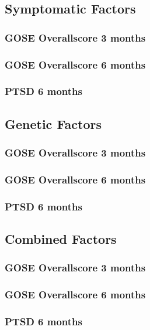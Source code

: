 \documentclass[11pt]{article}
\begin{document}
\subsection{Symptomatic Factors}
\subsubsection{GOSE Overallscore 3 months}
\subsubsection{GOSE Overallscore 6 months}
\subsubsection{PTSD 6 months}

\subsection{Genetic Factors}
\subsubsection{GOSE Overallscore 3 months}
\subsubsection{GOSE Overallscore 6 months}
\subsubsection{PTSD 6 months}

\subsection{Combined Factors}
\subsubsection{GOSE Overallscore 3 months}
\subsubsection{GOSE Overallscore 6 months}
\subsubsection{PTSD 6 months}
\end{document}
